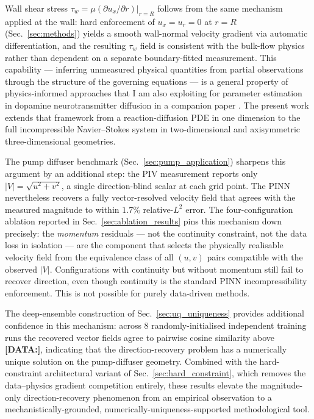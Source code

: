 \documentclass[12pt,a4paper]{article}
\newcommand{\DATA}[1]{{\color{orange}\textbf{[DATA:\;#1]}}}
\begin{document}
Wall shear stress
$\tau_w = \mu (\partial u_x / \partial r)|_{r=R}$ follows from the
same mechanism applied at the wall: hard enforcement of
$u_x = u_r = 0$ at $r = R$ (Sec.~\ref{sec:methods}) yields a
smooth wall-normal velocity gradient via automatic
differentiation, and the resulting $\tau_w$ field is consistent
with the bulk-flow physics rather than dependent on a separate
boundary-fitted measurement. This capability --- inferring
unmeasured physical quantities from partial observations through
the structure of the governing equations --- is a general
property of physics-informed approaches that I am also exploiting
for parameter estimation in dopamine neurotransmitter diffusion
in a companion paper \cite{HackmanB3_2025}. The present work
extends that framework from a reaction-diffusion PDE in one
dimension to the full incompressible Navier--Stokes system in
two-dimensional and axisymmetric three-dimensional geometries.

The pump diffuser benchmark (Sec.~\ref{sec:pump_application})
sharpens this argument by an additional step: the PIV measurement
reports only $|V| = \sqrt{u^2 + v^2}$, a single direction-blind
scalar at each grid point. The PINN nevertheless recovers a fully
vector-resolved velocity field that agrees with the measured
magnitude to within $1.7\%$ relative-$L^2$ error. The
four-configuration ablation reported in
Sec.~\ref{sec:ablation_results} pins this mechanism down
precisely: the \emph{momentum} residuals --- not the continuity
constraint, not the data loss in isolation --- are the
component that selects the physically realisable velocity field
from the equivalence class of all $(u,v)$ pairs compatible with
the observed $|V|$. Configurations with continuity but without
momentum still fail to recover direction, even though continuity
is the standard PINN incompressibility enforcement. This is
not possible for purely data-driven methods.

The deep-ensemble construction of Sec.~\ref{sec:uq_uniqueness}
provides additional confidence in this mechanism: across $8$
randomly-initialised independent training runs the recovered
vector fields agree to pairwise cosine similarity above
\DATA{[disc.cossim-min]}, indicating that the
direction-recovery problem has a numerically unique solution
on the pump-diffuser geometry. Combined with the hard-constraint
architectural variant of Sec.~\ref{sec:hard_constraint}, which
removes the data--physics gradient competition entirely, these
results elevate the magnitude-only direction-recovery
phenomenon from an empirical observation to a
mechanistically-grounded, numerically-uniqueness-supported
methodological tool.
\end{document}
